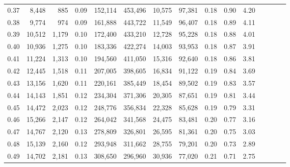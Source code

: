\begin{tabular}{rrrcrrrrrrrrrrr}
0.37 &   8,448 &    885 &                                       0.09 &  152,114 &  453,496 &   10,575 &   97,381 &  0.18 &  0.90 &                         4.20 \\
0.38 &   9,774 &    974 &                                       0.09 &  161,888 &  443,722 &   11,549 &   96,407 &  0.18 &  0.89 &                         4.11 \\
0.39 &  10,512 &  1,179 &                                       0.10 &  172,400 &  433,210 &   12,728 &   95,228 &  0.18 &  0.88 &                         4.01 \\
0.40 &  10,936 &  1,275 &                                       0.10 &  183,336 &  422,274 &   14,003 &   93,953 &  0.18 &  0.87 &                         3.91 \\
0.41 &  11,224 &  1,313 &                                       0.10 &  194,560 &  411,050 &   15,316 &   92,640 &  0.18 &  0.86 &                         3.81 \\
0.42 &  12,445 &  1,518 &                                       0.11 &  207,005 &  398,605 &   16,834 &   91,122 &  0.19 &  0.84 &                         3.69 \\
0.43 &  13,156 &  1,620 &                                       0.11 &  220,161 &  385,449 &   18,454 &   89,502 &  0.19 &  0.83 &                         3.57 \\
0.44 &  14,143 &  1,851 &                                       0.12 &  234,304 &  371,306 &   20,305 &   87,651 &  0.19 &  0.81 &                         3.44 \\
0.45 &  14,472 &  2,023 &                                       0.12 &  248,776 &  356,834 &   22,328 &   85,628 &  0.19 &  0.79 &                         3.31 \\
0.46 &  15,266 &  2,147 &                                       0.12 &  264,042 &  341,568 &   24,475 &   83,481 &  0.20 &  0.77 &                         3.16 \\
0.47 &  14,767 &  2,120 &                                       0.13 &  278,809 &  326,801 &   26,595 &   81,361 &  0.20 &  0.75 &                         3.03 \\
0.48 &  15,139 &  2,160 &                                       0.12 &  293,948 &  311,662 &   28,755 &   79,201 &  0.20 &  0.73 &                         2.89 \\
0.49 &  14,702 &  2,181 &                                       0.13 &  308,650 &  296,960 &   30,936 &   77,020 &  0.21 &  0.71 &                         2.75 \\

\end{tabular}
